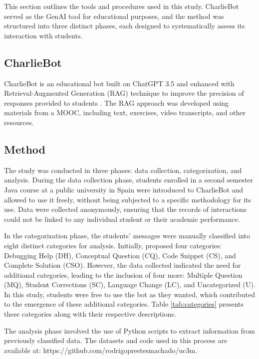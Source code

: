 \documentclass[a4paper,twoside]{article}
\begin{document}
This section outlines the tools and procedures used in this study. CharlieBot
served as the GenAI tool for educational purposes, and the method was structured
into three distinct phases, each designed to systematically assess its
interaction with students.

\subsection{CharlieBot}

CharlieBot is an educational bot built on ChatGPT 3.5 and enhanced with
Retrieval-Augmented Generation (RAG) technique to improve the precision of
responses provided to students \cite{Sun24}. The RAG approach was developed
using materials from a MOOC, including text, exercises, video transcripts, and
other resources.

\subsection{Method}

The study was conducted in three phases: data collection,
categorization, and analysis. During the data collection phase, students
enrolled in a second semester Java course at a public university in Spain were
introduced to CharlieBot and allowed to use it freely, without being subjected
to a specific methodology for its use. Data were collected anonymously, ensuring
that the records of interactions could not be linked to any individual student
or their academic performance.

In the categorization phase, the students' messages were manually classified
into eight distinct categories for analysis. Initially, \cite{Ghimire24}
proposed four categories: Debugging Help (DH), Conceptual Question (CQ), Code
Snippet (CS), and Complete Solution (CSO). However, the data collected indicated
the need for additional categories, leading to the inclusion of four more:
Multiple Question (MQ), Student Corrections (SC), Language Change (LC), and
Uncategorized (U). In this study, students were free to use the bot as they
wanted, which contributed to the emergence of these additional categories.
Table \ref{tab:categories} presents these categories along with their respective
descriptions.

The analysis phase involved the use of Python scripts to extract information
from previously classified data. The datasets and code used in this process are
available at: https://github.com/rodrigoprestesmachado/uc3m.
\end{document}
